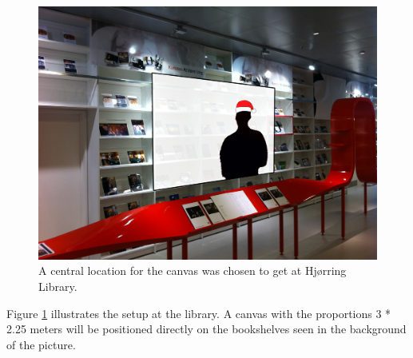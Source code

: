 \begin{figure}[htbp]
\centering
\includegraphics[width=1.00\textwidth]{Pictures/HjoerringLibrary/LocationJohannesHat.jpg}
\caption{A central location for the canvas was chosen to get at Hj{\o}rring Library.}
\label{fig:concept_art}
\end{figure}
Figure \ref{fig:concept_art} illustrates the setup at the library. A canvas with the proportions 3 * 2.25 meters will be positioned directly on the bookshelves seen in the background of the picture.




